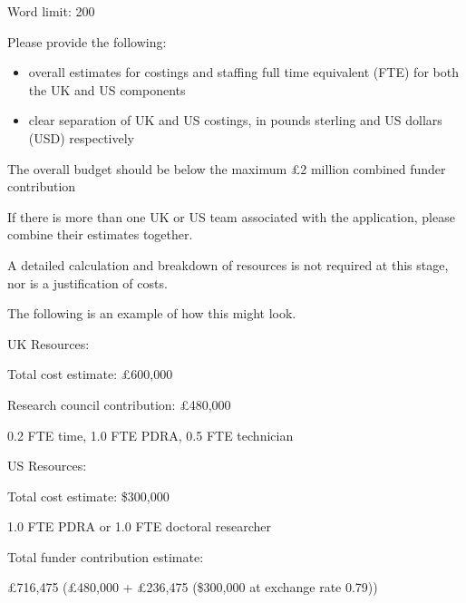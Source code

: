 \documentclass[12in]{article}
\newcommand{\referencessection}{\section*{References}}
\begin{document}
{\color{red}

Word limit: 200

Please provide the following:

\begin{itemize}

	\item overall estimates for costings and staffing full time equivalent (FTE) for both
the UK and US components

	\item clear separation of UK and US costings, in pounds sterling and US dollars
(USD) respectively

\end{itemize}

The overall budget should be below the maximum £2 million combined funder
contribution

If there is more than one UK or US team associated with the application, please
combine their estimates together.

A detailed calculation and breakdown of resources is not required at this stage,
nor is a justification of costs.

The following is an example of how this might look.

UK Resources:

Total cost estimate: £600,000

Research council contribution: £480,000

0.2 FTE time, 1.0 FTE PDRA, 0.5 FTE technician

US Resources:

Total cost estimate: \$300,000

1.0 FTE PDRA or 1.0 FTE doctoral researcher

Total funder contribution estimate:

£716,475 (£480,000 + £236,475 (\$300,000 at exchange rate 0.79))

}



{}

% 
% 
\end{document}

